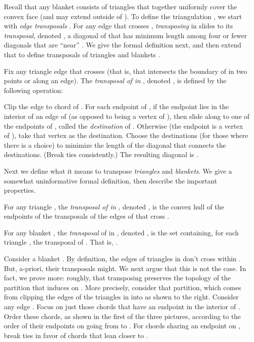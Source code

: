 \documentclass[final]{siamltex}
\begin{document}
Recall that any blanket  consists of triangles
that together uniformly cover the convex face  (and may extend outside of ).
To define the triangulation ,
we start with {\em edge transposals} \cite[e.g.~Lemma 4.2]{krznaric1998quasi}.
For any edge  that crosses , 
{\em transposing}  in 
slides  to its {\em transposal}, denoted ,
a diagonal of  that has minimum length 
among four or fewer diagonals that are ``near'' .
We give the formal definition next,
and then extend that to define transposals 
of triangles and blankets .
\begin{definition}
  Fix any triangle edge  that crosses  
  (that is, that intersects the boundary of  in two points or along an edge).
  The {\em transposal of  in },
  denoted , is defined
  by the following operation:
\begin{window}
  Clip the edge  to chord  of .
  For each endpoint  of ,
  if the endpoint lies in the interior of an edge  of  
  (as opposed to being a vertex of ),
  then slide  along  to one of the endpoints of ,
  called the {\em destination} of .
  Otherwise (the endpoint is a vertex of ), take that vertex as the destination.
  Choose the destinations (for those where there is a choice) to minimize the length
  of the diagonal that connects the destinations.  (Break ties consistently.)
  The resulting diagonal is .
\end{window}
\end{definition}

Next we define what it means to transpose {\em triangles} and {\em blankets}.
We give a somewhat uninformative formal definition, 
then describe the important properties.
\begin{definition}
  For any triangle ,
  the {\em transposal of  in },
  denoted ,
  is the convex hull of the endpoints of the transposals 
  of the edges of  that cross .


  For any blanket ,
  the {\em transposal} of  in ,
  denoted , 
  is the set containing, for each triangle , 
  the transposal  of .
  That is, .
\end{definition}

\begin{window}
  Consider a blanket .
  By definition, the edges of triangles in  don't cross within .
  But, a-priori, their transposals might.
  We next argue that this is not the case.
  In fact, we prove more:
  roughly, that transposing preserves 
  the topology of the partition that  induces on .
  More precisely, consider that partition, which comes from
  clipping the edges of the triangles in  into 
  as shown to the right.
  Consider any edge .
  Focus on just those chords that have an endpoint in the interior of .  
  Order these chords, as shown in the first of the three pictures,
  according to the order of their endpoints on  going from  to .
  For chords sharing an endpoint on ,
  break ties in favor of chords that lean closer to .
\end{window}
\end{document}
